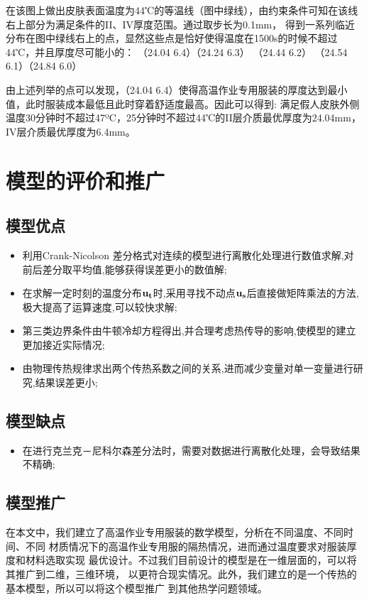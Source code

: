 \documentclass{cumcmthesis}
\begin{document}
        在该图上做出皮肤表面温度为44℃的等温线（图中绿线），由约束条件可知在该线右上部分为满足条件的II、IV厚度范围。通过取步长为0.1mm，
        得到一系列临近分布在图中绿线右上的点，显然这些点是恰好使得温度在1500s的时候不超过44℃，并且厚度尽可能小的：
        （24.04 6.4）（24.24 6.3） （24.44 6.2） （24.54 6.1）（24.84 6.0）
    
        由上述列举的点可以发现，（24.04 6.4）使得高温作业专用服装的厚度达到最小值，此时服装成本最低且此时穿着舒适度最高。因此可以得到:
        满足假人皮肤外侧温度30分钟时不超过47ºC，25分钟时不超过44℃的II层介质最优厚度为24.04mm，IV层介质最优厚度为6.4mm。
    
\section{模型的评价和推广}
    \subsection{模型优点} 
        \begin{itemize}
            \item 利用Crank-Nicolson 差分格式对连续的模型进行离散化处理进行数值求解,对前后差分取平均值,能够获得误差更小的数值解;
            \item 在求解一定时刻的温度分布\(\bf{u}_t\)时,采用寻找不动点\(\bf{u}_s\)后直接做矩阵乘法的方法,极大提高了运算速度,可以较快求解;
            \item 第三类边界条件由牛顿冷却方程得出,并合理考虑热传导的影响,使模型的建立更加接近实际情况;
            \item 由物理传热规律求出两个传热系数之间的关系,进而减少变量对单一变量进行研究,结果误差更小;
        \end{itemize}
    \subsection{模型缺点}
        \begin{itemize}
            \item 在进行克兰克－尼科尔森差分法时，需要对数据进行离散化处理，会导致结果不精确;
        \end{itemize}
    \subsection{模型推广}
        在本文中，我们建立了高温作业专用服装的数学模型，分析在不同温度、不同时间、不同
        材质情况下的高温作业专用服的隔热情况，进而通过温度要求对服装厚度和材料选取实现
        最优设计。不过我们目前设计的模型是在一维层面的，可以将其推广到二维，三维环境，
        以更符合现实情况。此外，我们建立的是一个传热的基本模型，所以可以将这个模型推广
        到其他热学问题领域。
\end{document}
